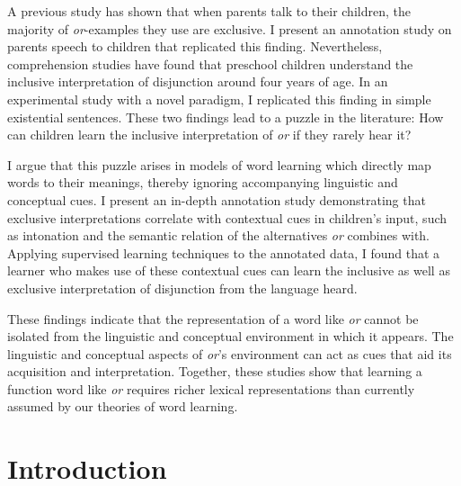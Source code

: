 \documentclass[oneside]{report}
\theoremstyle{definition}
\theoremstyle{definition}
\theoremstyle{definition}
\theoremstyle{remark}
\begin{document}
A previous study has shown that when parents talk to their children, the
majority of \emph{or}-examples they use are exclusive. I present an
annotation study on parents speech to children that replicated this
finding. Nevertheless, comprehension studies have found that preschool
children understand the inclusive interpretation of disjunction around
four years of age. In an experimental study with a novel paradigm, I
replicated this finding in simple existential sentences. These two
findings lead to a puzzle in the literature: How can children learn the
inclusive interpretation of \emph{or} if they rarely hear it?

I argue that this puzzle arises in models of word learning which
directly map words to their meanings, thereby ignoring accompanying
linguistic and conceptual cues. I present an in-depth annotation study
demonstrating that exclusive interpretations correlate with contextual
cues in children's input, such as intonation and the semantic relation
of the alternatives \emph{or} combines with. Applying supervised
learning techniques to the annotated data, I found that a learner who
makes use of these contextual cues can learn the inclusive as well as
exclusive interpretation of disjunction from the language heard.

These findings indicate that the representation of a word like \emph{or}
cannot be isolated from the linguistic and conceptual environment in
which it appears. The linguistic and conceptual aspects of \emph{or}'s
environment can act as cues that aid its acquisition and interpretation.
Together, these studies show that learning a function word like
\emph{or} requires richer lexical representations than currently assumed
by our theories of word learning.




\afterpreface


\chapter{Introduction}\label{introduction}
\end{document}
